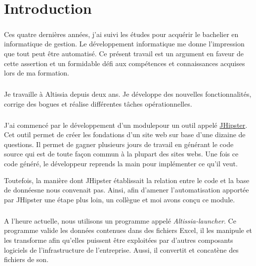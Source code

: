 \chapter{Introduction}
\label{ch:introduction}

\paragraph{}
Ces quatre dernières années, j'ai suivi les études pour acquérir le bachelier en informatique de gestion.
Le développement informatique me donne l'impression que tout peut être automatisé.
Ce présent travail est un argument en faveur de cette assertion et un formidable défi aux compétences et connaissances acquises lors de ma formation.

\paragraph{}
Je travaille à Altissia depuis deux ans.
Je développe des nouvelles fonctionnalités, corrige des bogues et réalise différentes tâches opérationnelles.

\paragraph{}
J'ai commencé par le développement d'un module\footnotemark pour un outil appelé \href{https://www.jhipster.tech/}{JHipster}.
Cet outil permet de créer les fondations d'un site web sur base d'une dizaine de questions.
Il permet de gagner plusieurs jours de travail en générant le code source qui est de toute façon commun à la plupart des sites webs.
Une fois ce code généré, le développeur reprends la main pour implémenter ce qu'il veut.

Toutefois, la manière dont JHipster établissait la relation entre le code et la base de données\footnotemark ne nous convenait pas.
Ainsi, afin d'amener l'automatisation apportée par JHipster une étape plus loin, un collègue et moi avons conçu ce module.


\paragraph{}
A l'heure actuelle, nous utilisons un programme appelé \textit{Altissia-launcher}.
Ce programme valide les données contenues dans des fichiers Excel, il les manipule et les transforme afin qu'elles puissent être exploitées par d'autres composants logiciels de l'infrastructure de l'entreprise.
Aussi, il convertit et concatène des fichiers de son.

